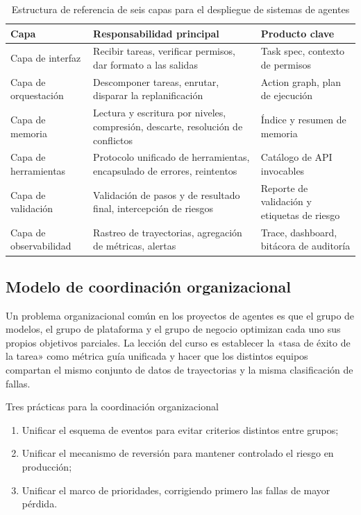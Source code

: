 \documentclass[a4paper]{article}
\begin{document}
\begin{table}[H]
\centering
\begin{tabular}{p{2.4cm}p{4.0cm}p{4.6cm}}
\toprule
\textbf{Capa} & \textbf{Responsabilidad principal} & \textbf{Producto clave} \\
\midrule
Capa de interfaz & Recibir tareas, verificar permisos, dar formato a las salidas & Task spec, contexto de permisos \\
Capa de orquestación & Descomponer tareas, enrutar, disparar la replanificación & Action graph, plan de ejecución \\
Capa de memoria & Lectura y escritura por niveles, compresión, descarte, resolución de conflictos & Índice y resumen de memoria \\
Capa de herramientas & Protocolo unificado de herramientas, encapsulado de errores, reintentos & Catálogo de API invocables \\
Capa de validación & Validación de pasos y de resultado final, intercepción de riesgos & Reporte de validación y etiquetas de riesgo \\
Capa de observabilidad & Rastreo de trayectorias, agregación de métricas, alertas & Trace, dashboard, bitácora de auditoría \\
\bottomrule
\end{tabular}
\caption{Estructura de referencia de seis capas para el despliegue de sistemas de agentes}
\end{table}

\subsection{Modelo de coordinación organizacional}
Un problema organizacional común en los proyectos de agentes es que el grupo de modelos, el grupo de plataforma y el grupo de negocio optimizan cada uno sus propios objetivos parciales. La lección del curso es establecer la «tasa de éxito de la tarea» como métrica guía unificada y hacer que los distintos equipos compartan el mismo conjunto de datos de trayectorias y la misma clasificación de fallas.

\begin{importantbox}{Tres prácticas para la coordinación organizacional}
\begin{enumerate}
    \item Unificar el esquema de eventos para evitar criterios distintos entre grupos;
    \item Unificar el mecanismo de reversión para mantener controlado el riesgo en producción;
    \item Unificar el marco de prioridades, corrigiendo primero las fallas de mayor pérdida.
\end{enumerate}
\end{importantbox}
\end{document}
